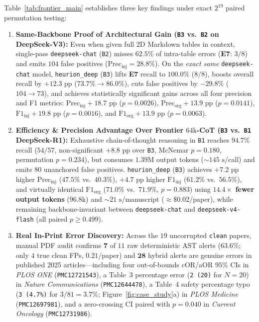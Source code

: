 \documentclass[11pt,a4paper]{article}
\begin{document}
Table~\ref{tab:frontier_main} establishes three key findings under exact $2^{19}$ paired permutation testing:
\begin{enumerate}[leftmargin=1.5em,itemsep=2pt]
  \item \textbf{Same-Backbone Proof of Architectural Gain (\texttt{B3} vs.\ \texttt{B2} on DeepSeek-V3):} Even when given full 2D Markdown tables in context, single-pass \texttt{deepseek-chat} (\texttt{B2}) misses $62.5\%$ of intra-table errors (\textbf{E7}: $3/8$) and emits $104$ false positives ($\text{Prec}_{\text{inj}}=28.8\%$). On the \emph{exact same} \texttt{deepseek-chat} model, \texttt{heurion\_deep} (\texttt{B3}) lifts \textbf{E7} recall to $\mathbf{100.0\%}$ ($8/8$), boosts overall recall by $+12.3\text{ pp}$ ($73.7\% \to 86.0\%$), cuts false positives by $-29.8\%$ ($104 \to 73$), and achieves statistically significant gains across all four precision and F1 metrics: $\text{Prec}_{\text{inj}} +18.7\text{ pp}$ ($p=0.0026$), $\text{Prec}_{\text{org}} +13.9\text{ pp}$ ($p=0.0141$), $\text{F1}_{\text{inj}} +19.8\text{ pp}$ ($p=0.0016$), and $\text{F1}_{\text{org}} +13.9\text{ pp}$ ($p=0.0063$).
  \item \textbf{Efficiency \& Precision Advantage Over Frontier $64\text{k}$-CoT (\texttt{B3} vs.\ \texttt{B1} DeepSeek-R1):} Exhaustive chain-of-thought reasoning in \texttt{B1} reaches $94.7\%$ recall ($54/57$, non-significant $+8.8\text{ pp}$ over \texttt{B3}, McNemar $p=0.180$, permutation $p=0.234$), but consumes $1.39\text{M}$ output tokens ($\sim 145\text{ s}$/call) and emits $80$ unanchored false positives. \texttt{heurion\_deep} (\texttt{B3}) achieves $+7.2\text{ pp}$ higher $\text{Prec}_{\text{inj}}$ ($47.5\%$ vs.\ $40.3\%$), $+4.7\text{ pp}$ higher $\text{F1}_{\text{inj}}$ ($61.2\%$ vs.\ $56.5\%$), and virtually identical $\text{F1}_{\text{org}}$ ($71.0\%$ vs.\ $71.9\%$, $p=0.883$) using $\mathbf{14.4\times}$ \textbf{fewer output tokens} ($96.8\text{k}$) and $\sim 21\text{ s}$/manuscript ($\approx \$0.02$/paper), while remaining backbone-invariant between \texttt{deepseek-chat} and \texttt{deepseek-v4-flash} (all paired $p \ge 0.499$).
  \item \textbf{Real In-Print Error Discovery:} Across the $19$ uncorrupted \texttt{clean} papers, manual PDF audit confirms $\mathbf{7}$ of $11$ raw deterministic AST alerts ($63.6\%$; only $4$ true clean FPs, $0.21$/paper) and $\mathbf{28}$ hybrid alerts are genuine errors in published 2025 articles---including four out-of-bounds cOR/aOR $95\%$ CIs in \emph{PLOS ONE} (\texttt{PMC12721543}), a Table~3 percentage error (\texttt{2 (20)} for $N=20$) in \emph{Nature Communications} (\texttt{PMC12644478}), a Table~4 safety percentage typo (\texttt{3 (4.7\%)} for $3/81 = 3.7\%$; Figure~\ref{fig:case_study}a) in \emph{PLOS Medicine} (\texttt{PMC12697981}), and a zero-crossing CI paired with $p=0.040$ in \emph{Current Oncology} (\texttt{PMC12731986}).
\end{enumerate}
\end{document}
